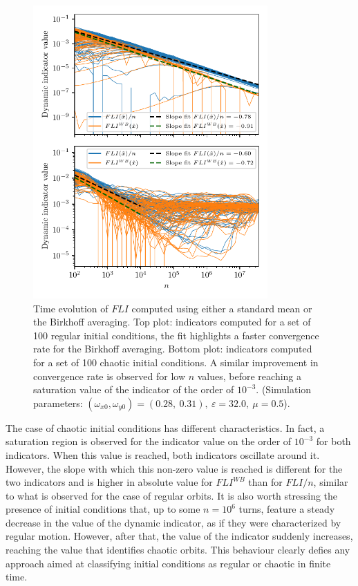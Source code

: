 \begin{figure}[htp]
    \centering
    \includegraphics[width=0.8\textwidth]{6_dynamic_indicators/fig/lyap_birkhoff.pdf}
    \caption{Time evolution of $FLI$ computed using either a standard mean or the Birkhoff averaging. Top plot: indicators computed for a set of 100 regular initial conditions, the fit highlights a faster convergence rate for the Birkhoff averaging. Bottom plot: indicators computed for a set of 100 chaotic initial conditions. A similar improvement in convergence rate is observed for low $n$ values, before reaching a saturation value of the indicator of the order of $10^{-3}$. (Simulation parameters: $(\omega_{x0},\omega_{y0})= (0.28,\ 0.31),\ \varepsilon=32.0,\ \mu=0.5$).}
    \label{fig:fli_compare_mean_birk}
\end{figure}

The case of chaotic initial conditions has different characteristics. In fact, a saturation region is observed for the indicator value on the order of $10^{-3}$ for both indicators. When this value is reached, both indicators oscillate around it. However, the slope with which this non-zero value is reached is different for the two indicators and is higher in absolute value for $FLI^{WB}$ than for $FLI/n$, similar to what is observed for the case of regular orbits. It is also worth stressing the presence of initial conditions that, up to some $n=10^6$ turns, feature a steady decrease in the value of the dynamic indicator, as if they were characterized by regular motion. However, after that, the value of the indicator suddenly increases, reaching the value that identifies chaotic orbits. This behaviour clearly defies any approach aimed at classifying initial conditions as regular or chaotic in finite time. 

